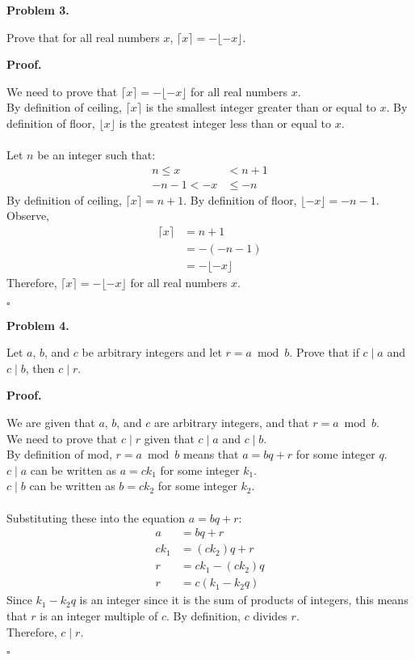 \documentclass{article}
\newenvironment{problem}[1]{
    \begin{mdframed}[backgroundcolor=gray!20, skipabove=\baselineskip, skipbelow=\baselineskip, nobreak=true, innerleftmargin=10pt, innerrightmargin=10pt, innertopmargin=10pt, innerbottommargin=10pt]
    \textbf{Problem #1.}
}{
    \end{mdframed}
}
\newenvironment{proof}{
    \begin{mdframed}[nobreak=true, innerleftmargin=10pt, innerrightmargin=10pt, innertopmargin=10pt, innerbottommargin=10pt]
    \textbf{Proof.}
}{
    \hfill $\square$
    \end{mdframed}
}
\begin{document}
\begin{problem}{3}
    Prove that for all real numbers $x$, $\lceil{x} \rceil = - \lfloor{-x} \rfloor$.
\end{problem}
\begin{proof}
    We need to prove that $\lceil{x} \rceil = - \lfloor{-x} \rfloor$ for all real numbers $x$. \\
    By definition of ceiling, $\lceil{x}\rceil$ is the smallest integer greater than or equal to $x$.
    By definition of floor, $\lfloor{x}\rfloor$ is the greatest integer less than or equal to $x$. \\ \\
    Let $n$ be an integer such that:
    \begin{align*}
        n \leq x &< n + 1 \\
        -n - 1 < -x &\leq -n
    \end{align*}
    By definition of ceiling, $\lceil{x}\rceil = n+1$. 
    By definition of floor, $\lfloor{-x}\rfloor = -n-1$. \\
    Observe,
    \begin{align*}
        \lceil{x}\rceil &= n+1 \\
        &= -(-n-1) \\
        &= -\lfloor{-x}\rfloor
    \end{align*}
    Therefore, $\lceil{x}\rceil = - \lfloor{-x}\rfloor$ for all real numbers $x$.
\end{proof}

\begin{problem}{4}
    Let $a$, $b$, and $c$ be arbitrary integers and let $r = a \bmod b$. Prove that if $c \mid a$ and $c \mid b$, then $c \mid r$.
\end{problem}
\begin{proof}
    We are given that $a$, $b$, and $c$ are arbitrary integers, and that $r = a \bmod b$. \\
    We need to prove that $c \mid r$ given that $c \mid a$ and $c \mid b$. \\
    By definition of mod, $r = a \bmod b$ means that $a = bq + r$ for some integer $q$. \\
    $c \mid a$ can be written as $a = ck_1$ for some integer $k_1$. \\
    $c \mid b$ can be written as $b = ck_2$ for some integer $k_2$. \\ \\
    Substituting these into the equation $a = bq + r$:
    \begin{align*}
        a &= bq + r \\
        ck_1 &= (ck_2)q + r \\
        r &= ck_1 - (ck_2)q \\
        r &= c(k_1 - k_2q)
    \end{align*}
    Since $k_1 - k_2q$ is an integer since it is the sum of products of integers, this means that $r$ is an integer multiple of $c$. By definition, $c$ divides $r$. \\
    Therefore, $c \mid r$.
\end{proof}
\end{document}
